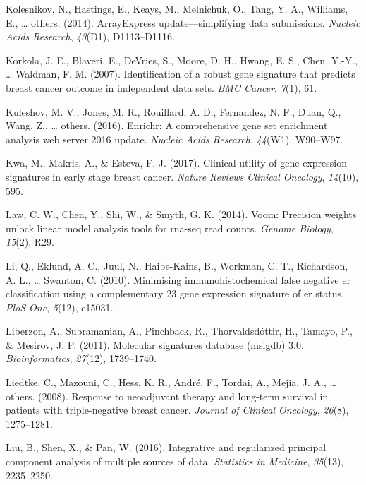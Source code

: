 \documentclass[12pt,twoside]{reedthesis}
\begin{document}
\leavevmode\hypertarget{ref-kolesnikov2014arrayexpress}{}%
Kolesnikov, N., Hastings, E., Keays, M., Melnichuk, O., Tang, Y. A., Williams, E., \ldots{} others. (2014). ArrayExpress update---simplifying data submissions. \emph{Nucleic Acids Research}, \emph{43}(D1), D1113--D1116.

\leavevmode\hypertarget{ref-korkola2007identification}{}%
Korkola, J. E., Blaveri, E., DeVries, S., Moore, D. H., Hwang, E. S., Chen, Y.-Y., \ldots{} Waldman, F. M. (2007). Identification of a robust gene signature that predicts breast cancer outcome in independent data sets. \emph{BMC Cancer}, \emph{7}(1), 61.

\leavevmode\hypertarget{ref-kuleshov2016enrichr}{}%
Kuleshov, M. V., Jones, M. R., Rouillard, A. D., Fernandez, N. F., Duan, Q., Wang, Z., \ldots{} others. (2016). Enrichr: A comprehensive gene set enrichment analysis web server 2016 update. \emph{Nucleic Acids Research}, \emph{44}(W1), W90--W97.

\leavevmode\hypertarget{ref-kwa2017clinical}{}%
Kwa, M., Makris, A., \& Esteva, F. J. (2017). Clinical utility of gene-expression signatures in early stage breast cancer. \emph{Nature Reviews Clinical Oncology}, \emph{14}(10), 595.

\leavevmode\hypertarget{ref-law2014voom}{}%
Law, C. W., Chen, Y., Shi, W., \& Smyth, G. K. (2014). Voom: Precision weights unlock linear model analysis tools for rna-seq read counts. \emph{Genome Biology}, \emph{15}(2), R29.

\leavevmode\hypertarget{ref-li2010minimising}{}%
Li, Q., Eklund, A. C., Juul, N., Haibe-Kains, B., Workman, C. T., Richardson, A. L., \ldots{} Swanton, C. (2010). Minimising immunohistochemical false negative er classification using a complementary 23 gene expression signature of er status. \emph{PloS One}, \emph{5}(12), e15031.

\leavevmode\hypertarget{ref-liberzon2011molecular}{}%
Liberzon, A., Subramanian, A., Pinchback, R., Thorvaldsdóttir, H., Tamayo, P., \& Mesirov, J. P. (2011). Molecular signatures database (msigdb) 3.0. \emph{Bioinformatics}, \emph{27}(12), 1739--1740.

\leavevmode\hypertarget{ref-liedtke2008response}{}%
Liedtke, C., Mazouni, C., Hess, K. R., André, F., Tordai, A., Mejia, J. A., \ldots{} others. (2008). Response to neoadjuvant therapy and long-term survival in patients with triple-negative breast cancer. \emph{Journal of Clinical Oncology}, \emph{26}(8), 1275--1281.

\leavevmode\hypertarget{ref-liu2016integrative}{}%
Liu, B., Shen, X., \& Pan, W. (2016). Integrative and regularized principal component analysis of multiple sources of data. \emph{Statistics in Medicine}, \emph{35}(13), 2235--2250.
\end{document}
